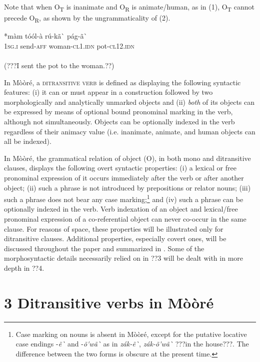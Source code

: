\documentclass[output=paper]{langsci/langscibook}
\begin{document}
Note that when O\textsubscript{T} is inanimate and O\textsubscript{R} is animate/human, as in (1), O\textsubscript{T} cannot precede O\textsubscript{R}, as shown by the ungrammaticality of (2).


\ea \gll 
\label{bkm:Ref444692191}*màm  tóól-à    rú-kã\`{ }      pág-ã\`{ }
\\
%
\textsc{1sg.i}    send-\textsc{aff}  woman-\textsc{cl1.idn}  pot-\textsc{cl12.idn}
\\\\\glt
(???I sent the pot to the woman.??)
\z

In Mòòré, a \textsc{ditransitive verb} is defined as displaying the following syntactic features: (i) it can or must appear in a construction followed by two morphologically and analytically unmarked objects and (ii) \textit{both} of its objects can be expressed by means of optional bound pronominal marking in the verb, although not simultaneously. Objects can be optionally indexed in the verb regardless of their animacy value (i.e. inanimate, animate, and human objects can all be indexed).

In Mòòré, the grammatical relation of object (O), in both mono and ditransitive clauses, displays the following overt syntactic properties: (i) a lexical or free pronominal expression of it occurs immediately after the verb or after another object; (ii) such a phrase is not introduced by prepositions or relator nouns; (iii) such a phrase does not bear any case marking;\footnote{ Case marking on nouns is absent in Mòòré, except for the putative locative case endings -\textit{ẽ\`{ } }and -\textit{\~{o}\'{ }wã\`{ }} as in \textit{zák-ẽ\`{ }}, \textit{zák-\~{o}\'{ }wã\`{ }} ???in the house???. The difference between the two forms is obscure at the present time.  }{ }and (iv) such a phrase can be optionally indexed in the verb. Verb indexation of an object and lexical/free pronominal expression of a co-referential object can never co-occur in the same clause. For reasons of space, these properties will be illustrated only for ditransitive clauses. Additional properties, especially covert ones, will be discussed throughout the paper and summarized in . Some of the morphosyntactic details necessarily relied on in ??3 will be dealt with in more depth in ??4.

\section{3 Ditransitive verbs in Mòòré}
\end{document}
